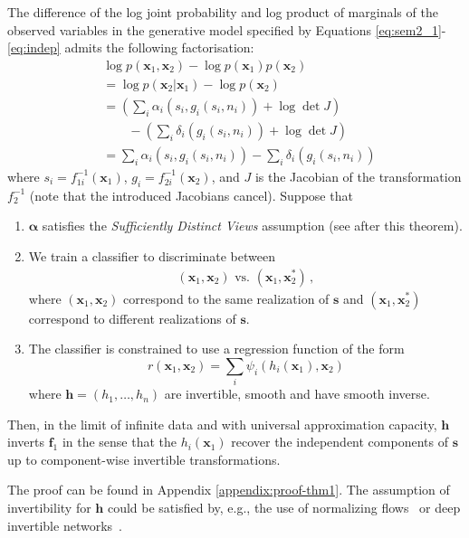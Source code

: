 \begin{theorem}
\label{thm:noiseless1}
The difference of the log joint probability and log product of marginals of the observed variables in the generative model specified by Equations \ref{eq:sem2_1}-\ref{eq:indep} admits the following factorisation:
\begin{align}
&\log p(\bm{x}_1, \bm{x}_2) - \log p(\bm{x}_1) p(\bm{x}_2) \nonumber \\
&= \log p(\bm{x}_2 | \bm{x}_1) - \log p(\bm{x}_2) \nonumber\\
&= \left(\sum_i \alpha_i(s_{i}, g_i(s_i, n_i)) + \log \det J \right) \nonumber\\
&\qquad - \left( \sum_i \delta_i(g_i(s_i, n_i)) + \log \det J\right) \nonumber\\
&= \sum_i \alpha_i(s_{i}, g_i(s_i, n_i)) - \sum_i \delta_i(g_i(s_i, n_i))\label{eq:logdens_noiesless_1} \,
\end{align}
where $s_i=f^{-1}_{1i}(\bm{x}_1)$, $g_i=f^{-1}_{2i}(\bm{x}_2)$,
and $J$ is the Jacobian of the transformation $f^{-1}_2$ (note that the introduced Jacobians cancel).
Suppose that
\begin{enumerate}
    \item $\bm{\alpha}$ satisfies the \emph{Sufficiently Distinct Views} assumption (see after this theorem).
    \item We train a classifier to discriminate between
\begin{align*}
(\bm{x}_{1},\bm{x}_{2}) \text{ vs. } (\bm{x}_{1},\bm{x}_{2}^{*})\,,
\end{align*}
where $(\bm{x}_{1},\bm{x}_{2})$ correspond to the same realization of $\bm{s}$ and $(\bm{x}_{1},\bm{x}_{2}^{*})$ correspond to different realizations of $\bm{s}$.
\item The classifier is constrained to use a regression function of the form
\begin{equation*}
r(\bm{x}_{1},\bm{x}_{2})=\sum_{i}\psi_{i}(h_{i}(\bm{x}_{1}),\bm{x}_{2})
\end{equation*}
where $\bm{h} =(h_{1}, \ldots, h_{n})$  are invertible, smooth and have smooth inverse.
\end{enumerate}

Then, in the limit of infinite data and with universal approximation capacity, $\bm{h}$ inverts $\bm{f}_1$ in the sense that the $h_{i}(\bm{x}_1)$ recover the independent  components of $\bm{s}$ up to component-wise invertible transformations.
\end{theorem}
The proof can be found in Appendix \ref{appendix:proof-thm1}.
The assumption of invertibility for $\bm{h}$ could be satisfied by, e.g., the use of normalizing flows~\cite{rezende2015variational, chen2018neural} or deep invertible networks~\cite{jacobsen_hal-01712808}.

